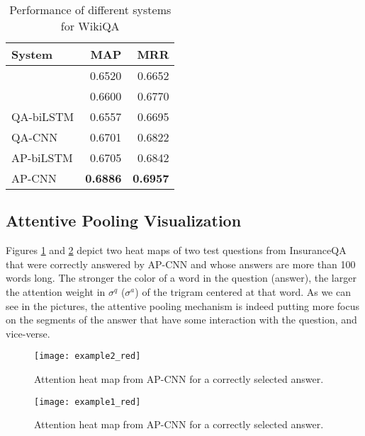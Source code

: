 \documentclass{article}
\begin{document}
\begin{table}[ht!]
\caption{Performance of different systems for WikiQA}
\label{tab:wikiqa}
\vskip 0.15in
\begin{center}
\begin{small}
\begin{sc}
\begin{tabular}{lrr}
\hline
\abovespace\belowspace
\bf System & \bf MAP & \bf MRR \\
\hline
\citet{yang2015}  &  0.6520   & 0.6652 \\
\citet{yin2015}   &    0.6600   & 0.6770 \\ 
\hline
QA-biLSTM  &   0.6557    &  0.6695 \\
QA-CNN     &   0.6701    &  0.6822 \\ 
AP-biLSTM  &   0.6705    &  0.6842  \\
AP-CNN     & \bf 0.6886  & \bf 0.6957 \\

\hline
\end{tabular}
\end{sc}
\end{small}
\end{center}
\vskip -0.1in
\end{table}

\subsection{Attentive Pooling Visualization}
Figures \ref{example1} and \ref{example2} depict two heat maps of two test questions from InsuranceQA that were correctly answered by AP-CNN and whose answers are more than 100 words long.
The stronger the color of a word in the question  (answer),
the larger the attention weight in $\sigma^q$ ($\sigma^a$) of the trigram centered at that word.
As we can see in the pictures,
the attentive pooling mechanism is indeed putting more focus on the segments of the answer that have some interaction with the question, and vice-verse.

\begin{figure}[ht]
\vskip 0.2in
\begin{center}
\centerline{\texttt{[image: example2\_red]}}
\caption{Attention heat map from AP-CNN for a correctly selected answer.}
\label{example1}
\end{center}
\vskip -0.2in
\end{figure}

\begin{figure}[ht]
\vskip 0.2in
\begin{center}
\centerline{\texttt{[image: example1\_red]}}
\caption{Attention heat map from AP-CNN for a correctly selected answer.}
\label{example2}
\end{center}
\vskip -0.2in
\end{figure}
\end{document}

